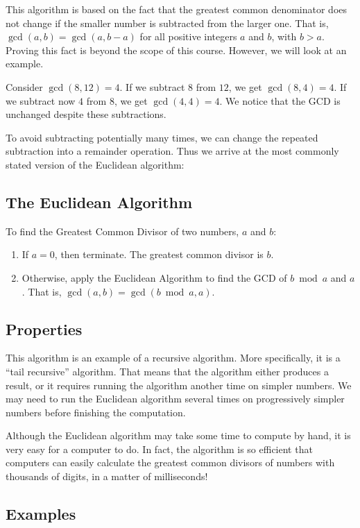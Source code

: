 \documentclass[a4paper,10pt]{report}
\begin{document}
This algorithm is based on the fact that the greatest common denominator does
not change if the smaller number is subtracted from the larger one. That is,
\(\gcd(a, b) = \gcd(a, b - a)\) for all positive integers \(a\) and \(b\), with
\(b>a\). Proving this fact is beyond the scope of this course. However, we will
look at an example.

Consider \(\gcd(8, 12)=4\). If we subtract \(8\) from \(12\), we get \(\gcd(8,
4)=4\). If we subtract now \(4\) from \(8\), we get \(\gcd(4, 4)=4\). We notice
that the GCD is unchanged despite these subtractions.

To avoid subtracting potentially many times, we can change the repeated
subtraction into a remainder operation. Thus we arrive at the most commonly
stated version of the Euclidean algorithm:

\subsection{The Euclidean Algorithm}

To find the Greatest Common Divisor of two numbers, \(a\) and \(b\):
\begin{enumerate}
 \item If \(a=0\), then terminate. The greatest common divisor is \(b\).
 \item Otherwise, apply the Euclidean Algorithm to find the GCD of \(b \bmod
 a\) and \(a\). That is, \(\gcd(a, b) = \gcd(b \bmod a, a)\).
\end{enumerate}

\subsection{Properties}

This algorithm is an example of a recursive algorithm. More specifically, it is
a ``tail recursive'' algorithm. That means that the algorithm either produces a
result, or it requires running the algorithm another time on simpler numbers.
We may need to run the Euclidean algorithm several times on progressively
simpler numbers before finishing the computation.

Although the Euclidean algorithm may take some time to compute by hand, it is
very easy for a computer to do. In fact, the algorithm is so efficient that
computers can easily calculate the greatest common divisors of numbers with
thousands of digits, in a matter of milliseconds!

\subsection{Examples}
\end{document}
